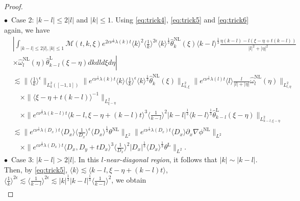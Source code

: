 \documentclass[reqno, 12pt]{amsart} %
\theoremstyle{plain} %
\theoremstyle{definition}
\theoremstyle{remark}
\numberwithin{equation}{section} %
\newcommand{\no}{\nonumber}
\newcommand{\lt}{\left}
\newcommand{\rt}{\right}
\begin{document}
\begin{proof}
\begin{align}
		\end{align}
		$\bullet$~Case 2:   $|k-l| \leq 2|l|$ and $|k|\leq 1$. Using \eqref{eq:trick4}, \eqref{eq:trick5} and \eqref{eq:trick6} again, we have 
		\begin{align} \label{eq:temp28}
			&\no \left| \int_{|k-l| \leq 2|l|,|k| \leq 1} \mathcal{M}(t, k, \xi) e^{2 c \nu^{\frac{1}{3}} \lambda(k) t}\langle k\rangle^2\langle\frac{1}{k}\rangle^{2 \epsilon} \langle k \rangle^\frac13\hat{\theta}_k^{\mathrm{NL}}(\xi) \langle k-l \rangle^\frac13  \frac{\eta(k-l)-l(\xi-\eta+t(k-l))}{|l|^2+|\eta|^2}\right. \\
			\no& \lt.  \times \hat{\omega}_l^{\mathrm{NL}}(\eta) \hat{\theta}_{k-l}^{\mathrm{L}}(\xi-\eta) d k d l d \xi d \eta \rt| \\
			&\no \lesssim\|\langle\frac{1}{k}\rangle^\epsilon\|_{L_k^2([-1,1])}\|e^{c \nu^{\frac{1}{3}} \lambda(k) t}\langle k\rangle\langle\frac{1}{k}\rangle^\epsilon \langle k \rangle^\frac13  \hat{\theta}_k^{\mathrm{NL}}(\xi)\|_{L_{k, \xi}^2}\|e^{c \nu^{\frac{1}{3}} \lambda(l) t}\langle l\rangle \frac{l}{|l|+|\eta|} \hat{\omega}_l^{\mathrm{NL}}(\eta)\|_{L_{l, \eta}^2} \\
			&\no \quad\times\|\langle\xi-\eta+t(k-l)\rangle^{-1}\|_{L_{\xi-\eta}^2} \\
			&\no \quad\times\|e^{c \nu^{\frac{1}{3}} \lambda(k-l) t}\langle k-l, \xi-\eta+(k-l) t\rangle^3\langle\frac{1}{k-l}\rangle^2|k-l|^{\frac{1}{3}} \langle k-l \rangle ^\frac13 \hat{\theta}_{k-l}^{\mathrm{L}}(\xi-\eta)\|_{L_{k-l, \xi-\eta}^2} \\
			&\no \lesssim\|e^{c \nu^{\frac{1}{3}} \lambda\left(D_x\right) t}\langle D_x\rangle\langle\frac{1}{D_x}\rangle^\epsilon \langle D_x \rangle^\frac13 \theta^{\mathrm{NL}}\|_{L^2}\|e^{c \nu^{\frac{1}{3}} \lambda\left(D_x\right) t}\langle D_x\rangle \partial_x \nabla \phi^{\mathrm{NL}}\|_{L^2} \\
			& \quad \times\|e^{c \nu^{\frac{1}{3}} \lambda\left(D_x\right) t}\langle D_x, D_y+t D_x\rangle^3\langle\frac{1}{D_x}\rangle^2\left|D_x\right|^{\frac{1}{3}}  \langle D_x \rangle^\frac13 \theta^{\mathrm{L}}\|_{L^2}.
		\end{align}
		$\bullet$~Case 3:   $|k-l| > 2|l|$. In this \emph{$l$-near-diagonal region}, it follows that $|k| \sim |k-l|$. Then, by \eqref{eq:trick5}, $\langle k\rangle \lesssim \langle k-l, \xi-\eta+(k-l) t\rangle$, $\langle\frac{1}{k}\rangle^{2 \epsilon}\lesssim \langle\frac{1}{k - l}\rangle^{2\epsilon} \lesssim |k|^\frac13 |k-l|^\frac13 \langle\frac{1}{k - l}\rangle^{2} $, we obtain 
		\begin{align} \label{eq:temp29}

\end{align}
\end{proof}
\end{document}
